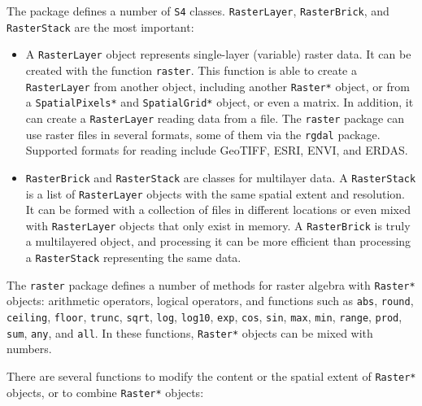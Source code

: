 \documentclass[smallroyalvopaper]{memoir}
\begin{document}
The package defines a number of \texttt{S4} classes. \texttt{RasterLayer}, \texttt{RasterBrick}, and \texttt{RasterStack} are the most important:

\begin{itemize}
\item A \texttt{RasterLayer} object represents single-layer (variable) raster
data. It can be created with the function \texttt{raster}. This function is able to create a \texttt{RasterLayer} from another object, including another \texttt{Raster*} object, or from a \texttt{SpatialPixels*} and \texttt{SpatialGrid*} object, or even a matrix. In addition, it can create a \texttt{RasterLayer} reading data from a file. The \texttt{raster} package can use raster files in several formats, some of them via the \texttt{rgdal} package. Supported formats for reading include GeoTIFF, ESRI, ENVI, and ERDAS.

\item \texttt{RasterBrick} and \texttt{RasterStack} are classes for multilayer data. A
\texttt{RasterStack} is a list of \texttt{RasterLayer} objects with the same spatial extent and resolution. It can be formed with a collection of files in different locations or even mixed with \texttt{RasterLayer} objects that only exist in memory. A \texttt{RasterBrick} is truly a multilayered object, and processing it can be more efficient than processing a \texttt{RasterStack} representing the same data.
\end{itemize}

The \texttt{raster} package defines a number of methods for raster algebra with \texttt{Raster*} objects: arithmetic operators, logical operators, and functions such as \texttt{abs}, \texttt{round}, \texttt{ceiling}, \texttt{floor}, \texttt{trunc}, \texttt{sqrt}, \texttt{log}, \texttt{log10}, \texttt{exp}, \texttt{cos}, \texttt{sin}, \texttt{max}, \texttt{min}, \texttt{range}, \texttt{prod}, \texttt{sum}, \texttt{any}, and \texttt{all}. In these functions, \texttt{Raster*} objects can be mixed with numbers.

There are several functions to modify the content or the spatial extent of \texttt{Raster*} objects, or to combine \texttt{Raster*} objects:
\end{document}
